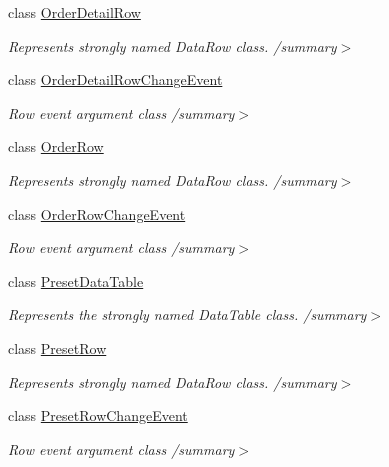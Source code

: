 \begin{DoxyCompactItemize}
class \hyperlink{class_products_1_1_data_1_1ds_sage_1_1_order_detail_row}{Order\+Detail\+Row}
\begin{DoxyCompactList}\small\item\em Represents strongly named Data\+Row class. /summary$>$ \end{DoxyCompactList}\item 
class \hyperlink{class_products_1_1_data_1_1ds_sage_1_1_order_detail_row_change_event}{Order\+Detail\+Row\+Change\+Event}
\begin{DoxyCompactList}\small\item\em Row event argument class /summary$>$ \end{DoxyCompactList}\item 
class \hyperlink{class_products_1_1_data_1_1ds_sage_1_1_order_row}{Order\+Row}
\begin{DoxyCompactList}\small\item\em Represents strongly named Data\+Row class. /summary$>$ \end{DoxyCompactList}\item 
class \hyperlink{class_products_1_1_data_1_1ds_sage_1_1_order_row_change_event}{Order\+Row\+Change\+Event}
\begin{DoxyCompactList}\small\item\em Row event argument class /summary$>$ \end{DoxyCompactList}\item 
class \hyperlink{class_products_1_1_data_1_1ds_sage_1_1_preset_data_table}{Preset\+Data\+Table}
\begin{DoxyCompactList}\small\item\em Represents the strongly named Data\+Table class. /summary$>$ \end{DoxyCompactList}\item 
class \hyperlink{class_products_1_1_data_1_1ds_sage_1_1_preset_row}{Preset\+Row}
\begin{DoxyCompactList}\small\item\em Represents strongly named Data\+Row class. /summary$>$ \end{DoxyCompactList}\item 
class \hyperlink{class_products_1_1_data_1_1ds_sage_1_1_preset_row_change_event}{Preset\+Row\+Change\+Event}
\begin{DoxyCompactList}\small\item\em Row event argument class /summary$>$ \end{DoxyCompactList}\item 

\end{DoxyCompactItemize}
